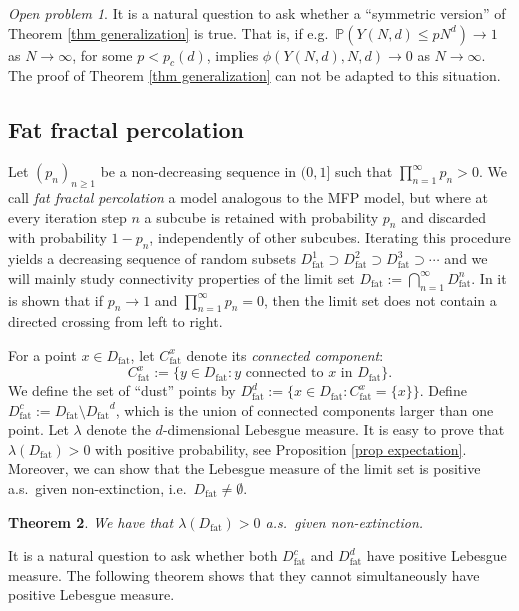 \documentclass[11pt,a4paper]{article}
\newcommand{\pc}{\ensuremath{p_{c}(d)}}
\newcommand{\IP}{\ensuremath{\mathbb{P}}}
\newcommand{\Dfat}{\ensuremath{D_{\text{fat}}}}
\newcommand{\Dfatc}{\ensuremath{D_{\text{fat}}^{c}}}
\newcommand{\Dfatd}{\ensuremath{D_{\text{fat}}^{d}}}
\newtheorem{theorem}{Theorem}[section]
\theoremstyle{remark}
\newtheorem{openproblem}[theorem]{Open problem}
\begin{document}
\begin{openproblem} It is a natural question to ask whether a ``symmetric version'' of Theorem \ref{thm generalization} is true. That is, if e.g.\ $\IP(Y(N,d) \leq p N^d) \to 1$ as $N \to \infty$, for some $p<\pc$, implies $\phi(Y(N,d),N,d) \to 0$ as $N \to \infty$. The proof of Theorem \ref{thm generalization} can not be adapted to this situation.
\end{openproblem}



\subsection{Fat fractal percolation}

Let $(p_n)_{n \geq 1}$ be a non-decreasing sequence in $(0,1]$ such that $\prod_{n=1}^{\infty} p_n >0$. We call \emph{fat fractal percolation} a model analogous to the MFP model, but where at every iteration step $n$ a subcube is retained with probability $p_n$ and discarded with probability $1-p_n$, independently of other subcubes. Iterating this procedure yields a decreasing sequence of random subsets 
$D^1_{\text{fat}} \supset D^2_{\text{fat}} \supset D^3_{\text{fat}}\supset \cdots$ and we will mainly study connectivity properties of the limit set $D_{\text{fat}} := \bigcap_{n=1}^\infty D_{\text{fat}}^n$. In \cite{ChaPemPer} it is shown that if $p_n\to 1$ and $\prod_{n=1}^{\infty} p_n=0$, then the limit set does not contain a directed crossing from left to right. 


For a point $x \in \Dfat$, let $C_{\text{fat}}^x$ denote its \emph{connected component}:
\[
 C_{\text{fat}}^x := \{y \in \Dfat: y \text{ connected to } x \text{ in } \Dfat\}.
\]
We define the set of ``dust'' points by $D^{d}_{\text{fat}}:= \{ x \in \Dfat: C_{\text{fat}}^x =\{x\} \}$. Define $D^{c}_{\text{fat}}:=\Dfat \setminus \Dfat^d$, which is the union of connected components larger than one point. Let $\lambda$ denote the $d$-dimensional Lebesgue measure. It is easy to prove that $\lambda(\Dfat)>0$ with positive probability, see Proposition \ref{prop expectation}. Moreover, we can show that the Lebesgue measure of the limit set is positive a.s.\ given non-extinction, i.e.\ $\Dfat \neq \emptyset$.


\begin{theorem}\label{thm12}
We have that $\lambda(\Dfat)>0$ a.s.\ given non-extinction.
\end{theorem}


It is a natural question to ask whether both $\Dfatc$ and $\Dfatd$ have positive Lebesgue measure. The following theorem shows that they cannot simultaneously have positive Lebesgue measure.
\end{document}
